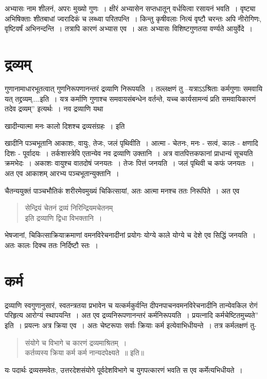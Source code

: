{अभ्यासः नाम शीलनं, अपरः मुख्यो गुणः~। क्षीरं अभ्यासेन सप्तधातून् वर्धयित्वा रसायनं भवति~। वृष्ट्या अभिषिक्ताः शीतबाधां ज्वरादिकं च लब्ध्वा परितपन्ति~। किन्तु कृषीवलाः नित्यं वृष्टौ चरन्तः अपि नीरोगिणः, वृष्टिवर्षं अभिनन्दन्ति~। तत्रापि कारणं अभ्यास एव~। अतः अभ्यासः विशिष्टगुणतया वर्ण्यते आयुर्वेदे~। 

\section*{द्रव्यम्}

गुणानामाधारभूतत्वात् गुणनिरूपणानन्तरं द्रव्याणि निरूपयति~। तल्लक्षणं तु –यत्राऽऽश्रिताः कर्मगुणाः समवायि यत् तद्द्रव्यम्....इति~। यत्र कर्माणि गुणाश्च समवायसंबन्धेन वर्तन्ते, यच्च कार्यसामन्यं प्रति समवायिकारणं तदेव द्रव्यम्” इत्यर्थः~। नव द्रव्याणि यथा \

खादीन्यात्मा मनः कालो दिशश्च द्रव्यसंग्रहः~। इति


खादीनि पञ्चभूतानि  आकाशः, वायुः, तेजः, जलं पृथिवीति~। आत्मा - चेतनः, मनः - सत्वं, कालः - क्षणादि दिशः - पूर्वादयः~। तर्कशास्त्रेपि एतान्येव नव द्रव्याणि उक्तानि~। अत्र वातपित्तकफानां प्राधान्यं सूचयति क्रमभेदः~। अकाशः वायुश्च वातदोषं जनयतः~। तेजः पित्तं जनयति~। जलं पृथिवी च कफं जनयतः~। अत एव आकाशम् आरभ्य पञ्चभूतान्युक्तानि~। 

चैतन्ययुक्तं पाञ्चभौतिकं शरीरमेवमुख्यं चिकित्सायां, अतः आत्मा मनश्च ततः निरूपिते~। अत एव
\begin{verse}
सेन्द्रियं चेतनं द्रव्यं निरिन्द्रियमचेतनम्\\
इति द्रव्याणि द्विधा विभक्तानि~। 
\end{verse}
भेषजानां, चिकित्साक्रियाक्रमाणां वमनविरेचनादीनां प्रयोगः योग्ये काले योग्ये च देशे एव सिद्धिं जनयति~। अतः कालः दिक्च ततः निर्दिष्टौ स्तः~। 

\section*{कर्म} 

द्रव्याणि स्वगुणानुसारं, स्वतन्त्रतया प्रभावेन च यत्कर्मकुर्वन्ति दीपनपाचनवमनविरेचनादीनि तान्येवकिल रोगं परिहृत्य आरोग्यं स्थापयन्ति~। अत एव द्रव्यनिरूपणानन्तरं कर्मनिरूपयति~। प्रयत्नादि कर्मचेष्टितमुच्यते” इति~। प्रयत्नः अत्र क्रिया एव~। अतः चेष्टरूपाः सर्वाः क्रियाः कर्म इत्येवाभिधीयन्ते~। तत्र कर्मलक्षणं तु-
\begin{verse}
संयोगे च विभागे च कारणं द्रव्यमाश्रितम्~। \\
कर्तव्यस्य क्रिया कर्म कर्म नान्यदपेक्ष्यते~॥ इति॥
\end{verse}
यः पदार्थः द्रव्यसमवेतः, उत्तरदेशसंयोगे पूर्वदेशविभागे च युगपत्कारणं भवति स एव कर्मेत्यभिधीयते~। 

}
